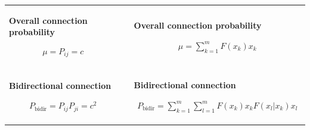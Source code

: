 \begin{frame}{}
\begin{tabular}{  p{}   p{}  p{} }
    \\
    
    \textbf{Overall connection probability}
    \vspace{0.12cm}
    
    \begin{align*}
      \mu = P_{ij} = c
    \end{align*}


    &&

    \textbf{Overall connection probability}
    \vspace{-0.08cm}
    
    \begin{align*}
      \mu = \sum_{k=1}^m F(x_k) x_k
    \end{align*}
    
    \\

    \textbf{Bidirectional connection}
    \vspace{0.12cm}
    
    \begin{align*}
      P_{\text{bidir}} = P_{ij} P_{ji} = c^2
    \end{align*}	

    &&

    \textbf{Bidirectional connection}
    \vspace{-0.08cm}
    
    \begin{align*}
      P_{\text{bidir}} = \sum_{k=1}^m \sum_{l=1}^m F(x_k) x_k F(x_l | x_k) x_l %
    \end{align*}	
    
  \end{tabular}


  
\end{frame}




